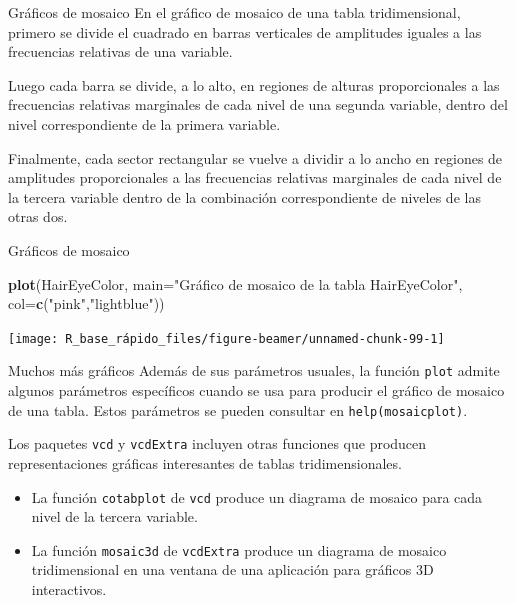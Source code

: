 \documentclass[
  ignorenonframetext,
  aspectratio=169]{beamer}
\newenvironment{Shaded}{\begin{snugshade}}{\end{snugshade}}
\newcommand{\AttributeTok}[1]{\textcolor[rgb]{0.13,0.29,0.53}{#1}}
\newcommand{\FunctionTok}[1]{\textcolor[rgb]{0.13,0.29,0.53}{\textbf{#1}}}
\newcommand{\NormalTok}[1]{#1}
\newcommand{\StringTok}[1]{\textcolor[rgb]{0.31,0.60,0.02}{#1}}
\providecommand{\tightlist}{%
  \setlength{\itemsep}{0pt}\setlength{\parskip}{0pt}}
\begin{document}
\begin{frame}{Gráficos de mosaico}
\label{gruxe1ficos-de-mosaico-2}
En el gráfico de mosaico de una tabla tridimensional, primero se divide
el cuadrado en barras verticales de amplitudes iguales a las frecuencias
relativas de una variable.

Luego cada barra se divide, a lo alto, en regiones de alturas
proporcionales a las frecuencias relativas marginales de cada nivel de
una segunda variable, dentro del nivel correspondiente de la primera
variable.

Finalmente, cada sector rectangular se vuelve a dividir a lo ancho en
regiones de amplitudes proporcionales a las frecuencias relativas
marginales de cada nivel de la tercera variable dentro de la combinación
correspondiente de niveles de las otras dos.
\end{frame}

\begin{frame}[fragile]{Gráficos de mosaico}
\label{gruxe1ficos-de-mosaico-3}
\begin{Shaded}
\begin{Highlighting}[]
\FunctionTok{plot}\NormalTok{(HairEyeColor, }\AttributeTok{main=}\StringTok{"Gráfico de mosaico de la tabla HairEyeColor"}\NormalTok{, }
     \AttributeTok{col=}\FunctionTok{c}\NormalTok{(}\StringTok{"pink"}\NormalTok{,}\StringTok{"lightblue"}\NormalTok{))}
\end{Highlighting}
\end{Shaded}

\begin{center}\texttt{[image: R\_base\_rápido\_files/figure-beamer/unnamed-chunk-99-1]} \end{center}
\end{frame}

\begin{frame}[fragile]{Muchos más gráficos}
\label{muchos-muxe1s-gruxe1ficos}
Además de sus parámetros usuales, la función \texttt{plot} admite
algunos parámetros específicos cuando se usa para producir el gráfico de
mosaico de una tabla. Estos parámetros se pueden consultar en
\texttt{help(mosaicplot)}.

Los paquetes \texttt{vcd} y \texttt{vcdExtra} incluyen otras funciones
que producen representaciones gráficas interesantes de tablas
tridimensionales.

\begin{itemize}
\tightlist
\item
  La función \texttt{cotabplot} de \texttt{vcd} produce un diagrama de
  mosaico para cada nivel de la tercera variable.
\item
  La función \texttt{mosaic3d} de \texttt{vcdExtra} produce un diagrama
  de mosaico tridimensional en una ventana de una aplicación para
  gráficos 3D interactivos.
\end{itemize}
\end{frame}
\end{document}
